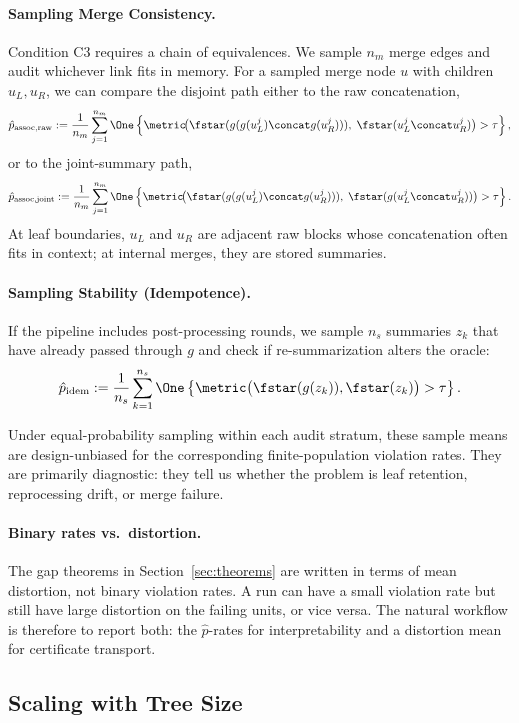 \paragraph{Sampling Merge Consistency.}
Condition C3 requires a chain of equivalences. We sample $n_m$ merge edges and audit whichever link fits in memory. For a sampled merge node $u$ with children $u_L, u_R$, we can compare the disjoint path either to the raw concatenation,
\[
\hat{p}_{\text{assoc,raw}} := \frac{1}{n_m} \sum_{j=1}^{n_m} \One\left\{ \metric\!\big(\fstar(g(g(u_L^j) \concat g(u_R^j))),\; \fstar(u_L^j \concat u_R^j)\big) > \tau \right\},
\]
or to the joint-summary path,
\[
\hat{p}_{\text{assoc,joint}} := \frac{1}{n_m} \sum_{j=1}^{n_m} \One\left\{ \metric\!\big(\fstar(g(g(u_L^j) \concat g(u_R^j))),\; \fstar(g(u_L^j \concat u_R^j))\big) > \tau \right\}.
\]
At leaf boundaries, $u_L$ and $u_R$ are adjacent raw blocks whose concatenation often fits in context; at internal merges, they are stored summaries.

\paragraph{Sampling Stability (Idempotence).}
If the pipeline includes post-processing rounds, we sample $n_s$ summaries $z_k$ that have already passed through $g$ and check if re-summarization alters the oracle:
\[
\hat{p}_{\text{idem}} := \frac{1}{n_s} \sum_{k=1}^{n_s} \One\left\{ \metric\big(\fstar(g(z_k)), \fstar(z_k)\big) > \tau \right\}.
\]

Under equal-probability sampling within each audit stratum, these sample means are design-unbiased for the corresponding finite-population violation rates. They are primarily diagnostic: they tell us whether the problem is leaf retention, reprocessing drift, or merge failure.

\paragraph{Binary rates vs.\ distortion.}
The gap theorems in Section~\ref{sec:theorems} are written in terms of mean distortion, not binary violation rates. A run can have a small violation rate but still have large distortion on the failing units, or vice versa. The natural workflow is therefore to report both: the $\hat{p}$-rates for interpretability and a distortion mean for certificate transport.

\subsection{Scaling with Tree Size}

